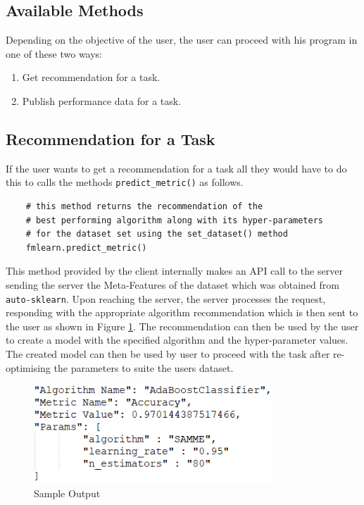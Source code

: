 \subsection*{Available Methods}

Depending on the objective of the user, the user can proceed with his program in one of these two ways:
\begin{enumerate}
    \item Get recommendation for a task.
    \item Publish performance data for a task.
\end{enumerate}

\subsection*{Recommendation for a Task}

If the user wants to get a recommendation for a task all they would have to do this to calls the methods \texttt{predict\_metric()} as follows.

\begin{lstlisting}
    # this method returns the recommendation of the
    # best performing algorithm along with its hyper-parameters
    # for the dataset set using the set_dataset() method
    fmlearn.predict_metric()
\end{lstlisting}

This method provided by the client internally makes an API call to the server sending the server the Meta-Features of the dataset which was obtained from \texttt{auto-sklearn}. Upon reaching the server, the server processes the request, responding with the appropriate algorithm recommendation which is then sent to the user as shown in Figure \ref{sample-output}. The recommendation can then be used by the user to create a model with the specified algorithm and the hyper-parameter values. The created model can then be used by user to proceed with the task after re-optimising the parameters to suite the users dataset.

\begin{figure}[H]
    \centering
    \includegraphics[width=9cm]{images/sample-output.png}
    \caption{Sample Output}
    \label{sample-output}
\end{figure}

